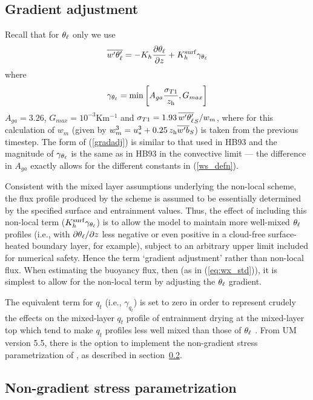 \documentclass{UMDP_article}
\begin{document}
\subsection{Gradient adjustment}
\label{sec:gradadj}
Recall that for $\theta_{\ell}$ only we use
\begin{equation}
  \overline{w'\theta_{\ell}'} = - K_h \frac{\partial \theta_{\ell}}{\partial z} + K_h^{\rm surf} \gamma_{\theta_{\ell}} 
\label{wthl}
\end{equation}
where 
\begin{equation}
  \gamma_{\theta_{\ell}} = 
  \mbox{min}\left[ A_{ga} \frac{\sigma_{T1}}{z_{\rm h}}, G_{max} \right]
  \label{gradadj}
\end{equation}
$A_{ga}=3.26$, $G_{max}=10^{-3}$Km$^{-1}$ and $\sigma_{T1} = 1.93 \,
\overline{w'\theta_{\ell}'}_S/w_m$, where for this calculation of $w_m$ (given by
$w_m^3=u_*^3+0.25\,z_{\rm h} \overline{w'b}_S$) \zh is taken from the previous
timestep.  The form of (\ref{gradadj}) is similar to that used in HB93
and the magnitude of $\gamma_{\theta_{\ell}}$ is the same as in HB93 in the
convective limit --- the difference in $A_{ga}$ exactly allows for the
different constants in (\ref{ws_defn}).

Consistent with the mixed layer assumptions underlying the non-local
scheme, the flux profile produced by the scheme is assumed to be
essentially determined by the specified surface and entrainment
values.  Thus, the effect of including this non-local term ($ K_h^{\rm surf}
\gamma_{\theta_{\ell}} $) is to allow the model to maintain more well-mixed
$\theta_{\ell}$ profiles (\mbox{i.e.}, with $\partial \theta_{\ell} / \partial z$
less negative or even positive in a cloud-free surface-heated boundary
layer, for example), subject to an arbitrary upper limit included for
numerical safety.  Hence the term `gradient adjustment' rather than
non-local flux.  When estimating the buoyancy flux, then (as in
(\ref{eq:wx_std})), it is simplest to allow for the non-local term by
adjusting the $\theta_{\ell}$ gradient.

The equivalent term for $q_t$ (\mbox{i.e.}, $\gamma_{q_t}$) is set to
zero in order to represent crudely the effects on the mixed-layer
$q_t$ profile of entrainment drying at the mixed-layer top which tend
to make $q_t$ profiles less well mixed than those of $\theta_{\ell}$
\cite[]{mahrt1976}.  From UM version 5.5, there is the option to
implement the non-gradient stress parametrization of
\cite{brown97:_non}, as described in section~\ref{sec:ngstress}.

\subsection{Non-gradient stress parametrization}
\label{sec:ngstress}
\end{document}
